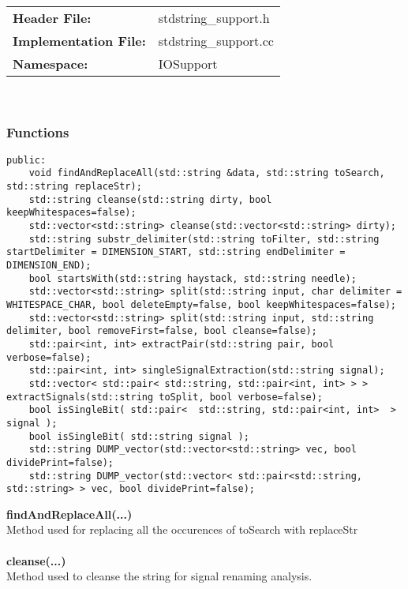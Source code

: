 \documentclass{article}
\begin{document}
\begin{tabular}{ll}
	\textbf{Header File:} & stdstring\_support.h\\
	\textbf{Implementation File:} & stdstring\_support.cc\\
	\textbf{Namespace: } & IOSupport\\
\end{tabular}\\

\subsubsection{Functions}

\begin{mdframed}[hidealllines=true, backgroundcolor=magenta!10]
	\begin{lstlisting}[basicstyle=\tiny]
public:
	void findAndReplaceAll(std::string &data, std::string toSearch, std::string replaceStr);
	std::string cleanse(std::string dirty, bool keepWhitespaces=false);
	std::vector<std::string> cleanse(std::vector<std::string> dirty);
	std::string substr_delimiter(std::string toFilter, std::string startDelimiter = DIMENSION_START, std::string endDelimiter = DIMENSION_END);
	bool startsWith(std::string haystack, std::string needle);
	std::vector<std::string> split(std::string input, char delimiter = WHITESPACE_CHAR, bool deleteEmpty=false, bool keepWhitespaces=false);
	std::vector<std::string> split(std::string input, std::string delimiter, bool removeFirst=false, bool cleanse=false);
	std::pair<int, int> extractPair(std::string pair, bool verbose=false);
	std::pair<int, int> singleSignalExtraction(std::string signal);
	std::vector< std::pair< std::string, std::pair<int, int> > > extractSignals(std::string toSplit, bool verbose=false);
	bool isSingleBit( std::pair<  std::string, std::pair<int, int>  > signal );
	bool isSingleBit( std::string signal );
	std::string DUMP_vector(std::vector<std::string> vec, bool dividePrint=false);
	std::string DUMP_vector(std::vector< std::pair<std::string, std::string> > vec, bool dividePrint=false);
	\end{lstlisting}
\end{mdframed}

\textbf{findAndReplaceAll(...)}\\
Method used for replacing all the occurences of toSearch with replaceStr\\\\

\textbf{cleanse(...)}\\
Method used to cleanse the string for signal renaming analysis.\\\\
\end{document}
